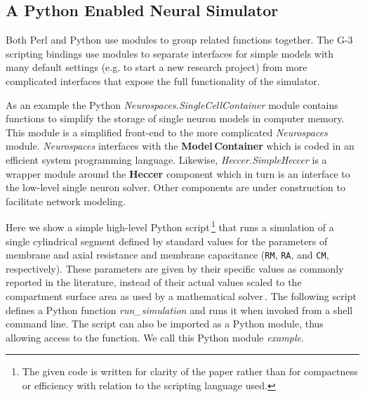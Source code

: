 \documentclass[12pt]{article}
\begin{document}
\subsection{A Python Enabled Neural Simulator}
\label{ss-apens}

Both Perl and Python use modules to group related functions together.
The G-3 scripting bindings use modules to separate interfaces for
simple models with many default settings (e.g. to start a new research
project) from more complicated interfaces that expose the full
functionality of the simulator.

As an example the Python {\it Neurospaces.SingleCellContainer} module
contains functions to simplify the storage of single neuron models in
computer memory.  This module is a simplified front-end to the more
complicated {\it Neurospaces} module.  {\it Neurospaces} interfaces
with the {\bf Model\,Container} which is coded in an efficient system
programming language.  Likewise, {\it Heccer.SimpleHeccer} is a
wrapper module around the {\bf Heccer} component which in turn is an
interface to the low-level single neuron solver.  Other components are
under construction to facilitate network modeling.

Here we show a simple high-level Python script\,\footnote{The given code
  is written for clarity of the paper rather than for compactness or
  efficiency with relation to the scripting language used.} that runs
a simulation of a single cylindrical segment defined by standard
values for the parameters of membrane and axial resistance and
membrane capacitance ({\tt RM}, {\tt RA},
and {\tt CM}, respectively).  These parameters are given by their
specific values as commonly reported in the literature, instead of
their actual values scaled to the compartment surface area as used by
a mathematical solver\,\cite{cornelis04:_neuros_param_handl}. The following
script defines a Python function {\it run\_simulation} and runs it
when invoked from a shell command line.  The script can also be
imported as a Python module, thus allowing access to the function.  We
call this Python module {\it example}.
\end{document}
